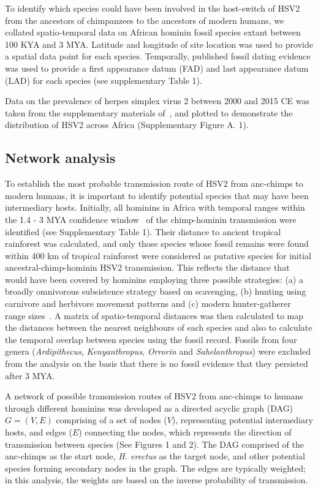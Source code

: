 \documentclass[fleqn,10pt]{wlscirep}
\begin{document}
To identify which species could have been involved in the host-switch of HSV2 from the ancestors of chimpanzees to the ancestors of modern humans, we collated spatio-temporal data on African hominin fossil species extant between 100 KYA and 3 MYA. Latitude and longitude of site location was used to provide a spatial data point for each species. Temporally, published fossil dating evidence was used to provide a first appearance datum (FAD) and last appearance datum (LAD) for each species (see supplementary Table 1).

Data on the prevalence of herpes simplex virus 2 between 2000 and 2015 CE was taken from the supplementary materials of~\citep{Looker2015}, and plotted to demonstrate the distribution of HSV2 across Africa (Supplementary Figure A. 1). 

\subsection*{Network analysis}
To establish the most probable transmission route of HSV2 from anc-chimps to modern humans, it is important to identify potential species that may have been intermediary hosts. Initially, all hominins in Africa with temporal ranges within the 1.4 - 3 MYA confidence window~\citep{Wertheim2014} of the chimp-hominin transmission were identified (see Supplementary Table 1). Their distance to ancient tropical rainforest was calculated, and only those species whose fossil remains were found within 400 km of tropical rainforest were considered as putative species for initial ancestral-chimp-hominin HSV2 transmission. This reflects the distance that would have been covered by hominins employing three possible strategies: (a) a broadly omnivorous subsistence strategy based on scavenging, (b) hunting using carnivore and herbivore movement patterns and (c) modern hunter-gatherer range sizes~\citep{Foley1978,Grant1992}. A matrix of spatio-temporal distances was then calculated to map the distances between the nearest neighbours of each species and also to calculate the temporal overlap between species using the fossil record. Fossils from four genera (\textit{Ardipithecus}, \textit{Kenyanthropus}, \textit{Orrorin} and \textit{Sahelanthropus}) were excluded from the analysis on the basis that there is no fossil evidence that they persisted after 3 MYA.

A network of possible transmission routes of HSV2 from anc-chimps to humans through different hominins was developed as a directed acyclic graph (DAG) $G = (V, E)$ comprising of a set of nodes ($V$), representing potential intermediary hosts, and edges ($E$) connecting the nodes, which represents the direction of transmission between species (See Figures 1 and 2). The DAG comprised of the anc-chimps as the start node, \textit{H. erectus} as the target node, and other potential species forming secondary nodes in the graph. The edges are typically weighted; in this analysis, the weights are based on the inverse probability of transmission.
\end{document}
